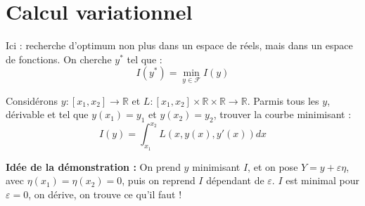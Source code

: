 \section{Calcul variationnel}
Ici : recherche d'optimum non plus dans un espace de réels, mais dans un espace de fonctions. On cherche $y^*$ tel que :
	\[I(y^*)=\min_{y\in\mathcal{F}}I(y)\]

Considérons $y:[x_1,x_2]\to \mathbb{R}$ et $L:[x_1,x_2]\times\mathbb{R}\times\mathbb{R}\to\mathbb{R}$. Parmis tous les $y$, dérivable et tel que $y(x_1)=y_1$ et $y(x_2)=y_2$, trouver la courbe minimisant : \[I(y)=\int_{x_1}^{x_2} L(x,y(x),y'(x)) dx\]


\textbf{Idée de la démonstration :} On prend $y$ minimisant $I$, et on pose $Y=y+\varepsilon \eta$, avec $\eta(x_1)=\eta(x_2)=0$, puis on reprend $I$ dépendant de $\varepsilon$. $I$ est minimal pour $\varepsilon=0$, on dérive, on trouve ce qu'il faut !


